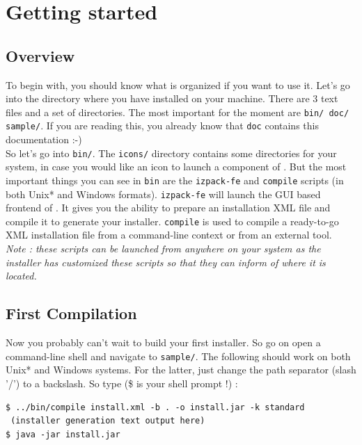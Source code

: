 \chapter{Getting started}

\section{Overview}

To begin with, you should know what \IzPack is organized if you want to use
it. Let's go into the directory where you have installed \IzPack on your
machine. There are 3 text files and a set of directories. The most
important for the moment are \texttt{bin/ doc/ sample/}. If you are reading this,
you already know that \texttt{doc} contains this documentation :-)\\

So let's go into \texttt{bin/}. The \texttt{icons/} directory contains some
directories for your system, in case you would like an icon to launch a
component of \IzPack. But the most important things you can see in \texttt{bin}
are the \texttt{izpack-fe} and \texttt{compile} scripts (in both Unix* and
Windows formats). \texttt{izpack-fe} will launch the GUI based frontend of
\IzPack. It gives you the ability to prepare an installation XML file and
compile it to generate your installer. \texttt{compile} is used to compile a
ready-to-go XML installation file from a command-line context or from an
external tool.\\

\noindent
\textit{Note : these scripts can be launched from anywhere on your system as the
installer has customized these scripts so that they can inform \IzPack of where
it is located.}\\

\section{First Compilation}

Now you probably can't wait to build your first installer. So go on open a
command-line shell and navigate to \texttt{sample/}. The following should work
on both Unix* and Windows systems. For the latter, just change the path
separator (slash '/') to a backslash. So type (\$ is your shell prompt !) :
\begin{verbatim}
$ ../bin/compile install.xml -b . -o install.jar -k standard
 (installer generation text output here)
$ java -jar install.jar
\end{verbatim}

